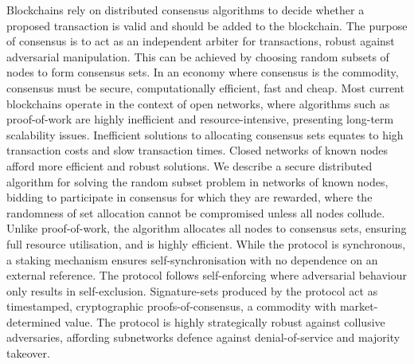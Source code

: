 Blockchains rely on distributed consensus algorithms to decide whether a proposed transaction is valid and should be added to the blockchain. The purpose of consensus is to act as an independent arbiter for transactions, robust against adversarial manipulation. This can be achieved by choosing random subsets of nodes to form consensus sets. In an economy where consensus is the commodity, consensus must be secure, computationally efficient, fast and cheap. Most current blockchains operate in the context of open networks, where algorithms such as proof-of-work are highly inefficient and resource-intensive, presenting long-term scalability issues. Inefficient solutions to allocating consensus sets equates to high transaction costs and slow transaction times. Closed networks of known nodes afford more efficient and robust solutions. We describe a secure distributed algorithm for solving the random subset problem in networks of known nodes, bidding to participate in consensus for which they are rewarded, where the randomness of set allocation cannot be compromised unless all nodes collude. Unlike proof-of-work, the algorithm allocates all nodes to consensus sets, ensuring full resource utilisation, and is highly efficient. While the protocol is synchronous, a staking mechanism ensures self-synchronisation with no dependence on an external reference. The protocol follows self-enforcing where adversarial behaviour only results in self-exclusion. Signature-sets produced by the protocol act as timestamped, cryptographic proofs-of-consensus, a commodity with market-determined value. The protocol is highly strategically robust against collusive adversaries, affording subnetworks defence against denial-of-service and majority takeover.